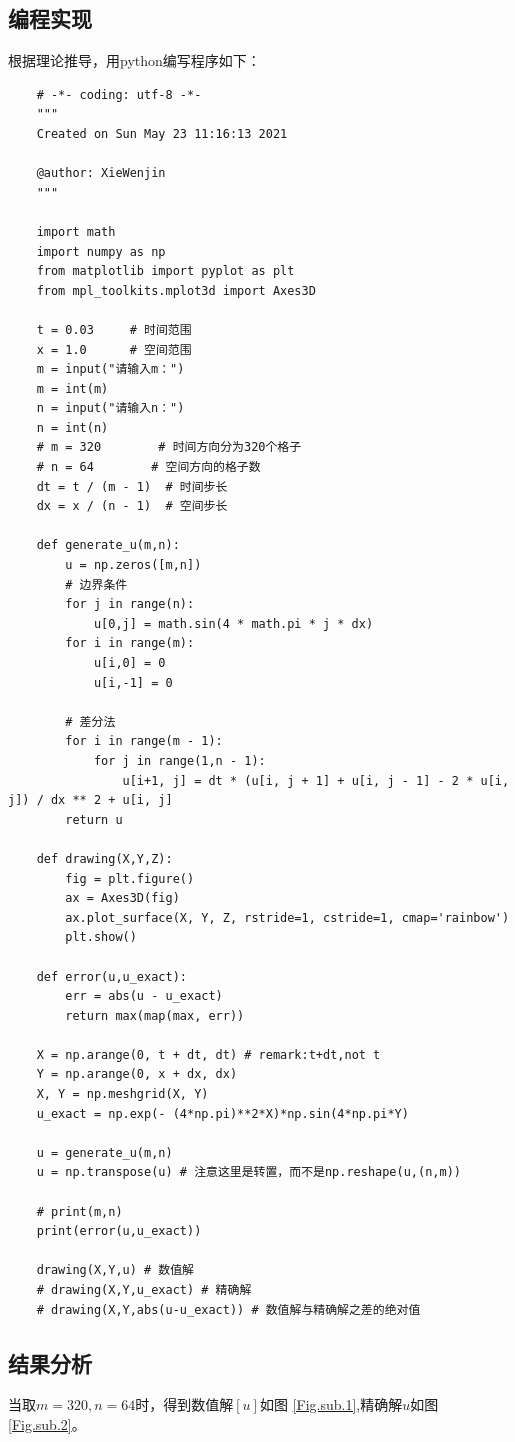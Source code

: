 \documentclass{ctexart}
\begin{document}
\subsection{编程实现}
根据理论推导，用python编写程序如下：
\begin{lstlisting}
    # -*- coding: utf-8 -*-
    """
    Created on Sun May 23 11:16:13 2021
    
    @author: XieWenjin
    """
    
    import math
    import numpy as np
    from matplotlib import pyplot as plt
    from mpl_toolkits.mplot3d import Axes3D
    
    t = 0.03     # 时间范围
    x = 1.0      # 空间范围
    m = input("请输入m：")
    m = int(m)
    n = input("请输入n：")
    n = int(n)
    # m = 320        # 时间方向分为320个格子
    # n = 64        # 空间方向的格子数
    dt = t / (m - 1)  # 时间步长
    dx = x / (n - 1)  # 空间步长
     
    def generate_u(m,n):
        u = np.zeros([m,n])
        # 边界条件
        for j in range(n):
            u[0,j] = math.sin(4 * math.pi * j * dx)
        for i in range(m):
            u[i,0] = 0
            u[i,-1] = 0
    
        # 差分法
        for i in range(m - 1):
            for j in range(1,n - 1):
                u[i+1, j] = dt * (u[i, j + 1] + u[i, j - 1] - 2 * u[i, j]) / dx ** 2 + u[i, j]
        return u
    
    def drawing(X,Y,Z):
        fig = plt.figure()
        ax = Axes3D(fig)
        ax.plot_surface(X, Y, Z, rstride=1, cstride=1, cmap='rainbow')
        plt.show()
    
    def error(u,u_exact):
        err = abs(u - u_exact)
        return max(map(max, err))
    
    X = np.arange(0, t + dt, dt) # remark:t+dt,not t
    Y = np.arange(0, x + dx, dx)
    X, Y = np.meshgrid(X, Y)
    u_exact = np.exp(- (4*np.pi)**2*X)*np.sin(4*np.pi*Y)
    
    u = generate_u(m,n)
    u = np.transpose(u) # 注意这里是转置，而不是np.reshape(u,(n,m))
    
    # print(m,n)
    print(error(u,u_exact))
    
    drawing(X,Y,u) # 数值解
    # drawing(X,Y,u_exact) # 精确解
    # drawing(X,Y,abs(u-u_exact)) # 数值解与精确解之差的绝对值
\end{lstlisting}

\subsection{结果分析}
当取$m=320,n=64$时，得到数值解$[u]$如图 \ref{Fig.sub.1},精确解$u$如图 \ref{Fig.sub.2}。
\end{document}
